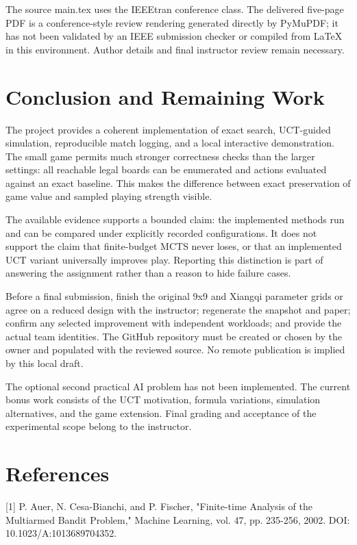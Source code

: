 \documentclass[conference]{IEEEtran}
\begin{document}
The source main.tex uses the IEEEtran conference class. The delivered five-page PDF is a conference-style review rendering generated directly by PyMuPDF; it has not been validated by an IEEE submission checker or compiled from LaTeX in this environment. Author details and final instructor review remain necessary.


\section{Conclusion and Remaining Work}

The project provides a coherent implementation of exact search, UCT-guided simulation, reproducible match logging, and a local interactive demonstration. The small game permits much stronger correctness checks than the larger settings: all reachable legal boards can be enumerated and actions evaluated against an exact baseline. This makes the difference between exact preservation of game value and sampled playing strength visible.


The available evidence supports a bounded claim: the implemented methods run and can be compared under explicitly recorded configurations. It does not support the claim that finite-budget MCTS never loses, or that an implemented UCT variant universally improves play. Reporting this distinction is part of answering the assignment rather than a reason to hide failure cases.


Before a final submission, finish the original 9x9 and Xiangqi parameter grids or agree on a reduced design with the instructor; regenerate the snapshot and paper; confirm any selected improvement with independent workloads; and provide the actual team identities. The GitHub repository must be created or chosen by the owner and populated with the reviewed source. No remote publication is implied by this local draft.


The optional second practical AI problem has not been implemented. The current bonus work consists of the UCT motivation, formula variations, simulation alternatives, and the game extension. Final grading and acceptance of the experimental scope belong to the instructor.


\section{References}

[1] P. Auer, N. Cesa-Bianchi, and P. Fischer, "Finite-time Analysis of the Multiarmed Bandit Problem," Machine Learning, vol. 47, pp. 235-256, 2002. DOI: 10.1023/A:1013689704352.
\end{document}
